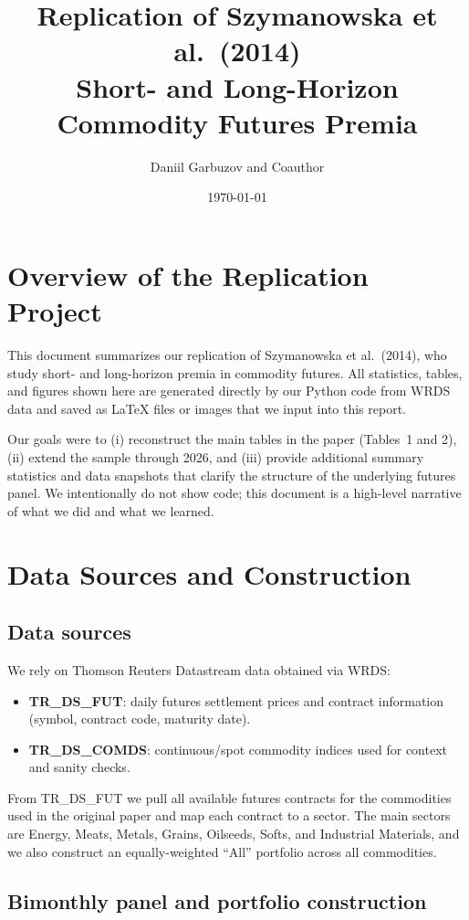 \documentclass[11pt]{article}
\title{Replication of Szymanowska et al.~(2014)\\
Short- and Long-Horizon Commodity Futures Premia}
\author{Daniil Garbuzov and Coauthor}
\date{\today}
\begin{document}
\maketitle

\section{Overview of the Replication Project}

This document summarizes our replication of Szymanowska et al.~(2014), who
study short- and long-horizon premia in commodity futures.
All statistics, tables, and figures shown here are generated directly by our
Python code from WRDS data and saved as \LaTeX{} files or images that we
input into this report.

Our goals were to (i) reconstruct the main tables in the paper (Tables~1 and
2), (ii) extend the sample through 2026, and (iii) provide additional summary
statistics and data snapshots that clarify the structure of the underlying
futures panel.
We intentionally do not show code; this document is a high-level narrative of
what we did and what we learned.

\section{Data Sources and Construction}

\subsection*{Data sources}

We rely on Thomson Reuters Datastream data obtained via WRDS:
\begin{itemize}
  \item \textbf{TR\_DS\_FUT}: daily futures settlement prices and contract
        information (symbol, contract code, maturity date).
  \item \textbf{TR\_DS\_COMDS}: continuous/spot commodity indices used for
        context and sanity checks.
\end{itemize}

From TR\_DS\_FUT we pull all available futures contracts for the commodities
used in the original paper and map each contract to a sector.
The main sectors are Energy, Meats, Metals, Grains, Oilseeds, Softs, and
Industrial Materials, and we also construct an equally-weighted ``All''
portfolio across all commodities.

\subsection*{Bimonthly panel and portfolio construction}
\end{document}
